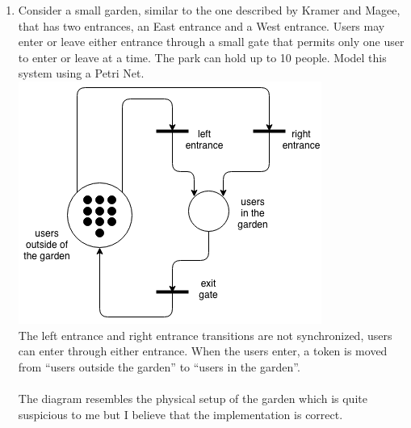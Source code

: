 \documentclass{article}
\begin{document}



\begin{enumerate}

\item Consider a small garden, similar to the one described by Kramer and Magee, that has two entrances, an East entrance and a West entrance. Users may enter or leave either entrance through a small gate that permits only one user to enter or leave at a time. The park can hold up to 10 people. Model this system using a Petri Net. \\
  \includegraphics[scale=0.5]{hw13p1.png} \\
  The left entrance and right entrance transitions are not synchronized, users can enter through either entrance. When the users enter, a token is moved from ``users outside the garden'' to ``users in the garden''. \\
  \\
  The diagram resembles the physical setup of the garden which is quite suspicious to me but I believe that the implementation is correct. \\


\end{enumerate}
\end{document}
